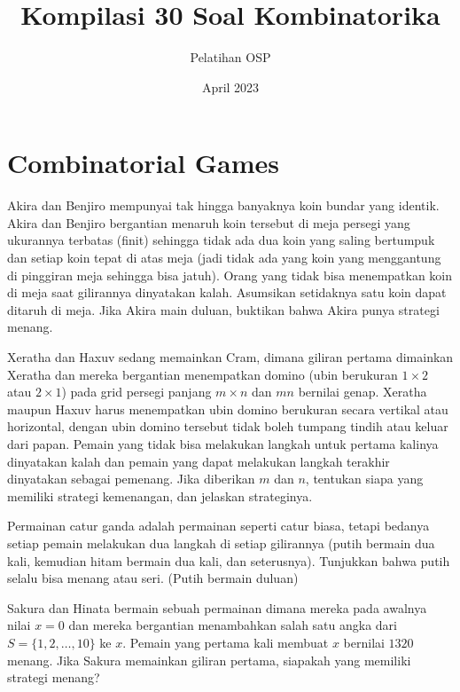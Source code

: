 \documentclass[12pt]{scrartcl}
\title{Kompilasi 30 Soal Kombinatorika}
\author{Pelatihan OSP}
\date{April 2023}
\begin{document}
\maketitle

\renewcommand*\contentsname{Daftar Isi}
\tableofcontents

\newpage

\section{Combinatorial Games}
\begin{soaljawab}
    Akira dan Benjiro mempunyai tak hingga banyaknya koin bundar yang identik. Akira dan Benjiro bergantian menaruh koin tersebut di meja persegi yang ukurannya terbatas (finit) sehingga tidak ada dua koin yang saling bertumpuk dan setiap koin tepat di atas meja (jadi tidak ada yang koin yang menggantung di pinggiran meja sehingga bisa jatuh). Orang yang tidak bisa menempatkan koin di meja saat gilirannya dinyatakan kalah. Asumsikan setidaknya satu koin dapat ditaruh di meja. Jika Akira main duluan, buktikan bahwa Akira punya strategi menang.
\end{soaljawab}

\begin{soaljawab}
Xeratha dan Haxuv sedang memainkan Cram, dimana giliran pertama dimainkan Xeratha dan mereka bergantian menempatkan domino (ubin berukuran $1 \times 2$ atau $2 \times 1$) pada grid persegi panjang $m \times n$ dan $mn$ bernilai genap. Xeratha maupun Haxuv harus menempatkan ubin domino berukuran secara vertikal atau horizontal, dengan ubin domino tersebut tidak boleh tumpang tindih atau keluar dari papan. Pemain yang tidak bisa melakukan langkah untuk pertama kalinya dinyatakan kalah dan pemain yang dapat melakukan langkah terakhir dinyatakan sebagai pemenang. Jika diberikan $m$ dan $n$, tentukan siapa yang memiliki strategi kemenangan, dan jelaskan strateginya.
\end{soaljawab}

\begin{soaljawab}
Permainan catur ganda adalah permainan seperti catur biasa, tetapi bedanya setiap pemain melakukan dua langkah di setiap gilirannya (putih bermain dua kali, kemudian hitam bermain dua kali, dan seterusnya). Tunjukkan bahwa putih selalu bisa menang atau seri. (Putih bermain duluan)
\end{soaljawab}

\begin{soaljawab}
Sakura dan Hinata bermain sebuah permainan dimana mereka pada awalnya nilai $x=0$ dan mereka bergantian menambahkan salah satu angka dari $S=\{1,2,\dots,10\}$ ke $x$. Pemain yang pertama kali membuat $x$ bernilai $1320$ menang. Jika Sakura memainkan giliran pertama, siapakah yang memiliki strategi menang?
\end{soaljawab}
\end{document}
